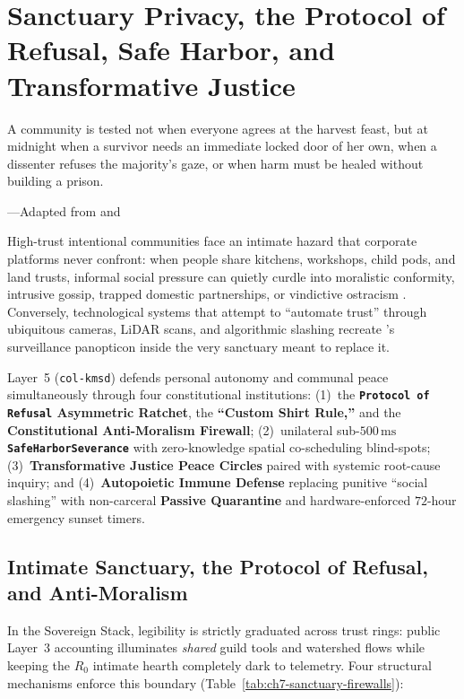 \chapter{Sanctuary Privacy, the Protocol of Refusal, Safe Harbor, and Transformative Justice}
\label{ch:l5-sanctuary-justice}

\epigraph{A community is tested not when everyone agrees at the harvest feast, but at midnight when a survivor needs an immediate locked door of her own, when a dissenter refuses the majority's gaze, or when harm must be healed without building a prison.}{---Adapted from \textcite{hirschman1970} and \textcite{zehr1990}}

High-trust intentional communities face an intimate hazard that corporate platforms never confront:
when people share kitchens, workshops, child pods, and land trusts, informal social pressure can
quietly curdle into moralistic conformity, intrusive gossip, trapped domestic partnerships, or
vindictive ostracism \parencite{freeman1972,mansbridge1980}. Conversely, technological systems that
attempt to ``automate trust'' through ubiquitous cameras, LiDAR scans, and algorithmic slashing
recreate \textcite{zuboff2019}'s surveillance panopticon inside the very sanctuary meant to
replace it.

Layer~5 (\texttt{col-kmsd}) defends personal autonomy and communal peace simultaneously through
four constitutional institutions: (1)~the \textbf{\texttt{Protocol of Refusal} Asymmetric Ratchet},
the \textbf{``Custom Shirt Rule,''} and the \textbf{Constitutional Anti-Moralism Firewall};
(2)~unilateral sub-$500\,\mathrm{ms}$ \textbf{\texttt{SafeHarborSeverance}} with zero-knowledge
spatial co-scheduling blind-spots; (3)~\textbf{Transformative Justice Peace Circles}
\parencite{zehr1990} paired with systemic root-cause inquiry; and (4)~\textbf{Autopoietic Immune
Defense} replacing punitive ``social slashing'' with non-carceral \textbf{Passive Quarantine} and
hardware-enforced $72$-hour emergency sunset timers.

\section{Intimate Sanctuary, the Protocol of Refusal, and Anti-Moralism}
\label{sec:ch7-protocol-of-refusal}

In the Sovereign Stack, legibility is strictly graduated across trust rings: public Layer~3
accounting illuminates \textit{shared} guild tools and watershed flows while keeping the $R_0$
intimate hearth completely dark to telemetry. Four structural mechanisms enforce this boundary
(Table~\ref{tab:ch7-sanctuary-firewalls}):

